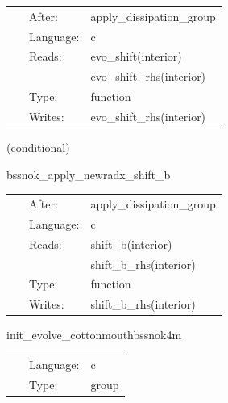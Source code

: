  \begin{tabular*}{160mm}{cll} 
~ & After:  & apply\_dissipation\_group \\ 
~ & Language:  & c \\ 
~ & Reads:  & evo\_shift(interior) \\ 
~& ~ &evo\_shift\_rhs(interior)\\ 
~ & Type:  & function \\ 
~ & Writes:  & evo\_shift\_rhs(interior) \\ 
\end{tabular*} 


\vspace{5mm}

   (conditional) 

\hspace{5mm} bssnok\_apply\_newradx\_shift\_b 



\hspace{5mm}

 \begin{tabular*}{160mm}{cll} 
~ & After:  & apply\_dissipation\_group \\ 
~ & Language:  & c \\ 
~ & Reads:  & shift\_b(interior) \\ 
~& ~ &shift\_b\_rhs(interior)\\ 
~ & Type:  & function \\ 
~ & Writes:  & shift\_b\_rhs(interior) \\ 
\end{tabular*} 


\vspace{5mm}


\hspace{5mm} init\_evolve\_cottonmouthbssnok4m 

\hspace{5mm}{\it group containing all functions from evolve that should run before step 0. generated by einsteinengine. } 


\hspace{5mm}

 \begin{tabular*}{160mm}{cll} 
~ & Language:  & c \\ 
~ & Type:  & group \\ 
\end{tabular*} 


